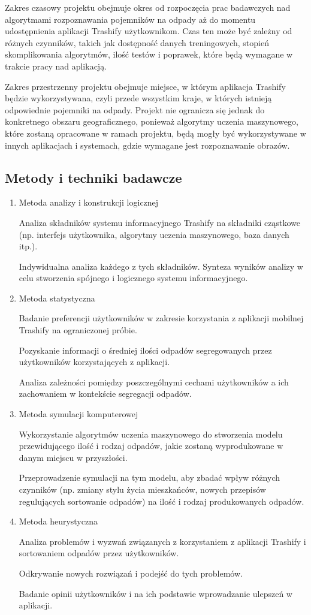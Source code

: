 \documentclass[12pt,oneside]{book}
\begin{document}
Zakres czasowy projektu obejmuje okres od rozpoczęcia prac badawczych nad algorytmami rozpoznawania pojemników na odpady aż do momentu udostępnienia aplikacji Trashify użytkownikom. Czas ten może być zależny od różnych czynników, takich jak dostępność danych treningowych, stopień skomplikowania algorytmów, ilość testów i poprawek, które będą wymagane w trakcie pracy nad aplikacją.

Zakres przestrzenny projektu obejmuje miejsce, w którym aplikacja Trashify będzie wykorzystywana, czyli przede wszystkim kraje, w których istnieją odpowiednie pojemniki na odpady. Projekt nie ogranicza się jednak do konkretnego obszaru geograficznego, ponieważ algorytmy uczenia maszynowego, które zostaną opracowane w ramach projektu, będą mogły być wykorzystywane w innych aplikacjach i systemach, gdzie wymagane jest rozpoznawanie obrazów.

\subsection{Metody i techniki badawcze}

\begin{enumerate}
    \item Metoda analizy i konstrukcji logicznej
    
    Analiza składników systemu informacyjnego Trashify na składniki cząstkowe (np. interfejs użytkownika, algorytmy uczenia maszynowego, baza danych itp.).

    Indywidualna analiza każdego z tych składników.
    Synteza wyników analizy w celu stworzenia spójnego i logicznego systemu informacyjnego.
    \item Metoda statystyczna
    
    Badanie preferencji użytkowników w zakresie korzystania z aplikacji mobilnej Trashify na ograniczonej próbie.

    Pozyskanie informacji o średniej ilości odpadów segregowanych przez użytkowników korzystających z aplikacji.

    Analiza zależności pomiędzy poszczególnymi cechami użytkowników a ich zachowaniem w kontekście segregacji odpadów.    
    \item Metoda symulacji komputerowej
    
    Wykorzystanie algorytmów uczenia maszynowego do stworzenia modelu przewidującego ilość i rodzaj odpadów, jakie zostaną wyprodukowane w danym miejscu w przyszłości.
    
    Przeprowadzenie symulacji na tym modelu, aby zbadać wpływ różnych czynników (np. zmiany stylu życia mieszkańców, nowych przepisów regulujących sortowanie odpadów) na ilość i rodzaj produkowanych odpadów.

    \item Metoda heurystyczna
    
    Analiza problemów i wyzwań związanych z korzystaniem z aplikacji Trashify i sortowaniem odpadów przez użytkowników.

    Odkrywanie nowych rozwiązań i podejść do tych problemów.
    
    Badanie opinii użytkowników i na ich podstawie wprowadzanie ulepszeń w aplikacji.
\end{enumerate}
\end{document}
